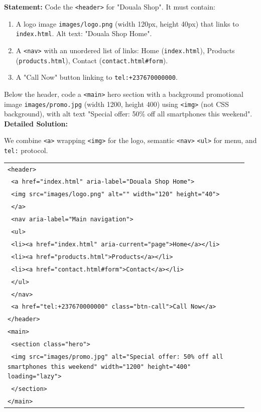 \documentclass[11pt]{article}
\begin{document}
\begin{exoresolu}
\textbf{Statement:} Code the \texttt{<header>} for "Douala Shop". It must contain:
\begin{enumerate}
    \item A logo image \texttt{images/logo.png} (width 120px, height 40px) that links to \texttt{index.html}. Alt text: "Douala Shop Home".
    \item A \texttt{<nav>} with an unordered list of links: Home (\texttt{index.html}), Products (\texttt{products.html}), Contact (\texttt{contact.html\#form}).
    \item A "Call Now" button linking to \texttt{tel:+237670000000}.
\end{enumerate}
Below the header, code a \texttt{<main>} hero section with a background promotional image \texttt{images/promo.jpg} (width 1200, height 400) using \texttt{<img>} (not CSS background), with alt text "Special offer: 50\% off all smartphones this weekend".
\tcblower
\textbf{Detailed Solution:}

We combine \texttt{<a>} wrapping \texttt{<img>} for the logo, semantic \texttt{<nav>} \texttt{<ul>} for menu, and \texttt{tel:} protocol.

\begin{center}
\begin{tabular}{|p{0.95\linewidth}|}\hline
\texttt{<header>}\\
\texttt{  <a href="index.html" aria-label="Douala Shop Home">}\\
\texttt{    <img src="images/logo.png" alt="" width="120" height="40">}\\
\texttt{  </a>}\\
\texttt{  <nav aria-label="Main navigation">}\\
\texttt{    <ul>}\\
\texttt{      <li><a href="index.html" aria-current="page">Home</a></li>}\\
\texttt{      <li><a href="products.html">Products</a></li>}\\
\texttt{      <li><a href="contact.html\#form">Contact</a></li>}\\
\texttt{    </ul>}\\
\texttt{  </nav>}\\
\texttt{  <a href="tel:+237670000000" class="btn-call">Call Now</a>}\\
\texttt{</header>}\\
\texttt{<main>}\\
\texttt{  <section class="hero">}\\
\texttt{    <img src="images/promo.jpg" alt="Special offer: 50\% off all smartphones this weekend" width="1200" height="400" loading="lazy">}\\
\texttt{  </section>}\\
\texttt{</main>}\\\hline
\end{tabular}
\end{center}


\end{exoresolu}
\end{document}
